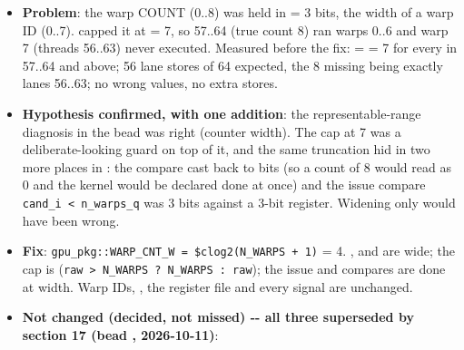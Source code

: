 \begin{record}

\begin{itemize}
\tightlist
\item
  \textbf{Problem}: the warp COUNT (0..8) was held in  = 3
  bits, the width of a warp ID (0..7).  capped it at
   = 7, so  57..64 (true count 8) ran
  warps 0..6 and warp 7 (threads 56..63) never executed. Measured before
  the fix:  =  = 7 for every
   in 57..64 and above; 56 lane stores of 64 expected, the
  8 missing being exactly lanes 56..63; no wrong values, no extra
  stores.
\item
  \textbf{Hypothesis confirmed, with one addition}: the
  representable-range diagnosis in the bead was right (counter width).
  The cap at 7 was a deliberate-looking guard on top of it, and the same
  truncation hid in two more places in : the
   compare cast  back to 
  bits (so a count of 8 would read as 0 and the kernel would be declared
  done at once) and the issue compare
  \texttt{cand\_\allowbreak{}i\ <\ n\_\allowbreak{}warps\_\allowbreak{}q}
  was 3 bits against a 3-bit register. Widening only 
  would have been wrong.
\item
  \textbf{Fix}:
  \texttt{gpu\_\allowbreak{}pkg:\allowbreak{}:\allowbreak{}WARP\_\allowbreak{}CNT\_\allowbreak{}W\ =\allowbreak{}\ \$clog2(N\_\allowbreak{}WARPS\ +\allowbreak{}\ 1)}
  = 4. ,  and
   are  wide; the cap is 
  (\texttt{raw\ >\ N\_\allowbreak{}WARPS\ ?\ N\_\allowbreak{}WARPS\ :\allowbreak{}\ raw});
  the issue and  compares are done at 
  width. Warp IDs, , the register file and every
   signal are unchanged.
\item
  \textbf{Not changed (decided, not missed) -\/- all three superseded by
  section 17 (bead , 2026-10-11)}:


\end{itemize}
\end{record}
